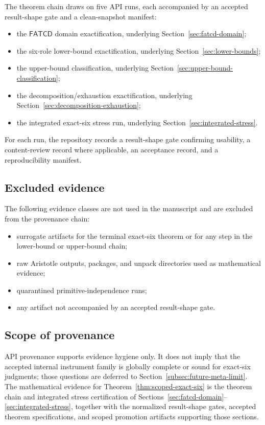 \documentclass[11pt]{article}
\theoremstyle{definition}
\newcommand{\FATCD}{\ensuremath{\mathsf{FATCD}}}
\begin{document}
The theorem chain draws on five API runs, each accompanied by an
accepted result-shape gate and a clean-snapshot manifest:

\begin{itemize}[topsep=2pt,itemsep=1pt]
  \item the \FATCD{} domain exactification, underlying
    Section~\ref{sec:fatcd-domain};
  \item the six-role lower-bound exactification, underlying
    Section~\ref{sec:lower-bounds};
  \item the upper-bound classification, underlying
    Section~\ref{sec:upper-bound-classification};
  \item the decomposition/exhaustion exactification, underlying
    Section~\ref{sec:decomposition-exhaustion};
  \item the integrated exact-six stress run, underlying
    Section~\ref{sec:integrated-stress}.
\end{itemize}

For each run, the repository records a result-shape gate confirming
usability, a content-review record where applicable, an acceptance
record, and a reproducibility manifest.

\subsection{Excluded evidence}\label{app:excluded-evidence}

The following evidence classes are not used in the manuscript and are
excluded from the provenance chain:
\begin{itemize}[topsep=2pt,itemsep=1pt]
  \item surrogate artifacts for the terminal exact-six theorem or for
    any step in the lower-bound or upper-bound chain;
  \item raw Aristotle outputs, packages, and unpack directories used
    as mathematical evidence;
  \item quarantined primitive-independence runs;
  \item any artifact not accompanied by an accepted result-shape
    gate.
\end{itemize}

\subsection{Scope of provenance}\label{app:scope-of-provenance}

API provenance supports evidence hygiene only. It does not imply that
the accepted internal instrument family is globally complete or sound
for exact-six judgments; those questions are deferred to
Section~\ref{subsec:future-meta-limit}. The mathematical evidence for
Theorem~\ref{thm:scoped-exact-six} is the theorem chain and
integrated stress certification of
Sections~\ref{sec:fatcd-domain}--\ref{sec:integrated-stress},
together with the normalized result-shape gates, accepted theorem
specifications, and scoped promotion artifacts supporting those
sections.
\end{document}
